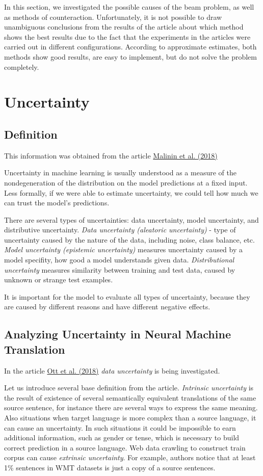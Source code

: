 \documentclass[a4paper,14pt]{extarticle}
\newcommand{\bibref}[3]{\hyperlink{#1}{#2 (#3)}}
\begin{document}
	In this section, we investigated the possible causes of the beam problem, as well as methods of counteraction. Unfortunately, it is not possible to draw unambiguous conclusions from the results of the article about which method shows the best results due to the fact that the experiments in the articles were carried out in different configurations. According to approximate estimates, both methods show good results, are easy to implement, but do not solve the problem completely.
	
	\section{Uncertainty}
	\subsection{Definition}
	This information was obtained from the article \bibref{prior}{Malinin et al.}{2018}
	
	Uncertainty in machine learning is usually understood as a measure of the nondegeneration of the distribution on the model predictions at a fixed input. Less formally, if we were able to estimate uncertainty, we could tell how much we can trust the model's predictions.
	
	There are several types of uncertainties: data uncertainty, model uncertainty, and distributive uncertainty. \textit{Data uncertainty (aleatoric uncertainty)} - type of uncertainty caused by the nature of the data, including noise, class balance, etc. \textit{Model uncertainty (epistemic uncertainty)}  measures uncertainty caused by a model specifity, how good a model understands given data. \textit{Distributional uncertainty} measures similarity between training and test data, caused by unknown or strange test examples. 
	
	It is important for the model to evaluate all types of uncertainty, because they are caused by different reasons and have different negative effects.
	
	\subsection{Analyzing Uncertainty in Neural Machine Translation}
	In the article \bibref{anal_uncertainty}{Ott et al.}{2018} \textit{data uncertainty} is being investigated.
	
	Let us introduce several base definition from the article. \textit{Intrinsic uncertainty} is the result of existence of several semantically equivalent translations of the same source sentence, for instance there are several ways to express the same meaning. Also situations when target language is more complex than a source language, it can cause an uncertainty. In such situations it could be impossible to earn additional information, such as gender or tense, which is necessary to build correct prediction in a source language. Web data crawling to construct train corpus can cause \textit{extrinsic uncertainty}. For example, authors notice that at least 1\% sentences in WMT datasets is just a copy of a source sentences.
	
\end{document}
